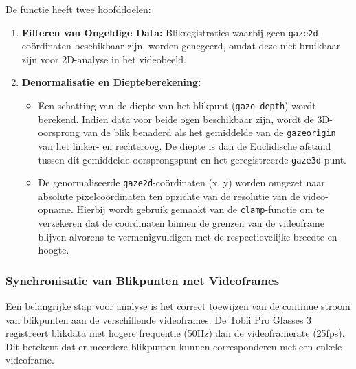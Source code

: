 De functie heeft twee hoofddoelen:
\begin{enumerate}
  \item \textbf{Filteren van Ongeldige Data:} Blikregistraties waarbij geen \texttt{gaze2d}-coördina\-ten beschikbaar zijn, 
  worden genegeerd, omdat deze niet bruikbaar zijn voor 2D-analyse in het videobeeld.
  \item \textbf{Denormalisatie en Diepteberekening:}
    \begin{itemize}
      \item Een schatting van de diepte van het blikpunt (\texttt{gaze\_depth}) wordt berekend. 
        Indien data voor beide ogen beschikbaar zijn, wordt de 3D-oorspr\-ong van de blik benaderd als 
        het gemiddelde van de \texttt{gazeorigin} van het lin\-ker- en rechteroog. 
        De diepte is dan de Euclidische afstand tussen dit gemiddelde oorsprongspunt en het geregistreerde \texttt{gaze3d}-punt.
      \item De genormaliseerde \texttt{gaze2d}-coördinaten (x, y) worden omgezet naar absolute pixelcoördinaten 
        ten opzichte van de resolutie van de video-opna\-me. 
        Hierbij wordt gebruik gemaakt van de \texttt{clamp}-functie om te verzekeren dat de coördinaten 
        binnen de grenzen van de videoframe blijven alvorens te vermenigvuldigen met de respectievelijke breedte en hoogte.
    \end{itemize}
\end{enumerate}

\subsubsection{Synchronisatie van Blikpunten met Videoframes}
\label{sec:synchronisatie-blikpunten-videoframes}

Een belangrijke stap voor analyse is het correct toewijzen van de continue stroom van blikpunten aan de verschillende videoframes.
De Tobii Pro Glasses 3 registreert blikdata met hogere frequentie (50Hz) dan de videoframerate (25fps).
Dit betekent dat er meerdere blikpunten kunnen corresponderen met een enkele videoframe.

